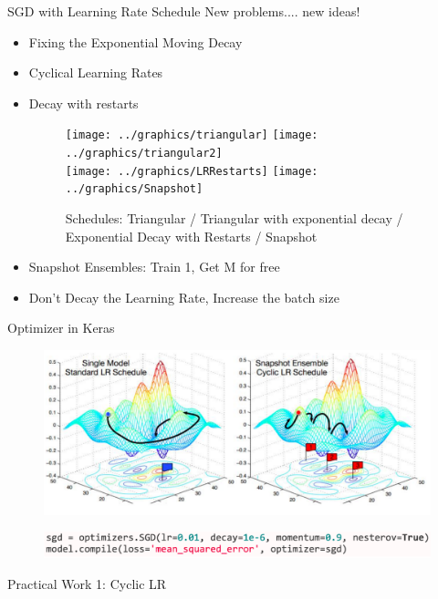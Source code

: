 \documentclass[xcolor=pdftex,dvipsnames,table,mathserif]{beamer}
\begin{document}
\begin{frame}{SGD with Learning Rate Schedule}
New problems.... new ideas!
\begin{itemize}
\item Fixing the Exponential Moving Decay \cite{dozat2016deep}
\item Cyclical Learning Rates \cite{smith2017cyclical}
\item Decay with restarts  \cite{loshchilov2016sgdr}
\begin{figure}
\texttt{[image: ../graphics/triangular]}
\texttt{[image: ../graphics/triangular2]}\\
\texttt{[image: ../graphics/LRRestarts]}
\texttt{[image: ../graphics/Snapshot]}
\caption{Schedules: Triangular  / Triangular with exponential decay / Exponential Decay with Restarts / Snapshot }
\end{figure}
\item Snapshot Ensembles: Train 1, Get M for free \cite{huang2017snapshot}
\item Don't Decay the Learning Rate, Increase the batch size \cite{smith2018don}
\end{itemize}
\end{frame}





\begin{frame}{Optimizer in Keras}
\begin{figure}
\includegraphics[width=.95\columnwidth]{../graphics/SnapshotCurve}
\caption{\cite{huang2017snapshot}}
\end{figure}
\begin{figure}
\includegraphics[width=.95\columnwidth]{../graphics/KerasSGD}
\end{figure}
Practical Work 1:  Cyclic LR
\end{frame}
\end{document}

